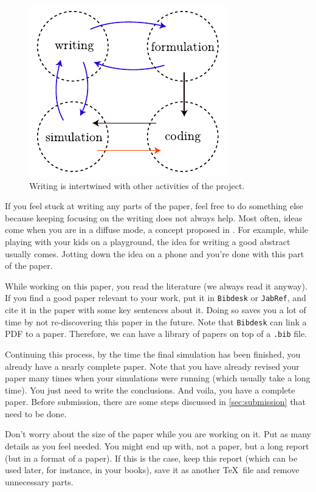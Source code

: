 \documentclass[authoryear,3p,times,preprint,review,fleqn]{elsarticle}
\numberwithin{equation}{section}
\theoremstyle{remark}
\begin{document}

 \begin{figure}[!ht]
      \centering
      \includegraphics{writing.pdf}
      \caption{Writing is intertwined with other activities of the project.}
      \label{fig:writing}
    \end{figure}

If you feel stuck at writing any parts of the paper, feel free to do something else because keeping focusing on the writing does not always help. Most often, ideas come when you are in a diffuse mode, a concept proposed in \cite{Oakley:2018a}. For example, while playing with your kids on a playground, the idea for writing a good abstract usually comes. Jotting down the idea on a phone and you're done with this part of the paper.

While working on this paper, you read the literature (we always read it anyway). If you find a good paper relevant to your work, put it in \texttt{Bibdesk} or \texttt{JabRef}, and cite it in the paper with some key sentences about it. Doing so saves you a lot of time by not re-discovering this paper in the future. Note that \texttt{Bibdesk} can link a PDF to a paper. Therefore, we can have a library of papers on top of a \texttt{.bib} file. 

Continuing this process, by the time the final simulation has been finished, you already have a nearly complete paper. Note that you have already revised your paper many times when your simulations were running (which usually take a long time).
You just need to write the conclusions. And voila, you have a complete paper. Before submission, there are some steps discussed in \cref{sec:submission} that need to be done.

Don't worry about the size of the paper while you are working on it. Put as many details as you feel needed. You might end up with, not a paper, but a long report (but in a format of a paper). If this is the case, keep this report (which can be used later, for instance, in your books), save it as another \TeX\ file and remove unnecessary parts.
\end{document}

